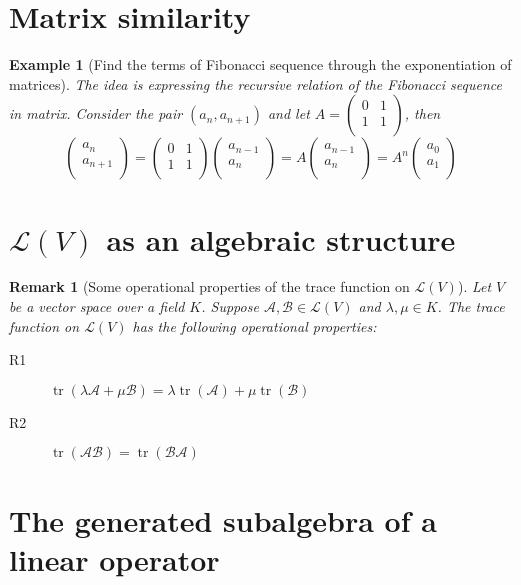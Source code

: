 \documentclass[onecolumn]{ctexart}
\newtheorem{remark}{Remark}
\newtheorem{example}{Example}
\DeclareMathOperator{\tr}{tr}
\begin{document}
\section{Matrix similarity}

\begin{example}[Find the terms of Fibonacci sequence through the exponentiation of matrices]
  The idea is expressing the recursive relation of the Fibonacci sequence in matrix. Consider the pair $(a_n, a_{n+1})$ and let
  $A = \begin{pmatrix}
    0 & 1 \\
    1 & 1 \\
  \end{pmatrix}$, then 
  \[
    \begin{pmatrix}
      a_n \\
      a_{n+1} \\
    \end{pmatrix} = 
    \begin{pmatrix}
      0 & 1 \\
      1 & 1 \\
    \end{pmatrix}
    \begin{pmatrix}
      a_{n-1} \\
      a_n \\
    \end{pmatrix} = A
    \begin{pmatrix}
      a_{n-1} \\
      a_n \\
    \end{pmatrix} = A^n
    \begin{pmatrix}
      a_0 \\
      a_1 \\
    \end{pmatrix}
  \]
\end{example}

\section{$\mathcal{L}(V)$ as an algebraic structure}

\begin{remark}[Some operational properties of the trace function on $\mathcal{L}(V)$]
  Let $V$ be a vector space over a field $K$. Suppose $\mathcal{A}, \mathcal{B} \in \mathcal{L}(V)$ and $\lambda, \mu \in K$. The trace function on $\mathcal{L}(V)$ has the following operational properties:
  \begin{description}
    \item[R1] $\tr(\lambda \mathcal{A} + \mu \mathcal{B}) = \lambda \tr(\mathcal{A}) + \mu \tr(\mathcal{B})$
    \item[R2] $\tr(\mathcal{A}\mathcal{B}) = \tr(\mathcal{B}\mathcal{A})$
  \end{description}
\end{remark}

\section{The generated subalgebra of a linear operator}
\end{document}
